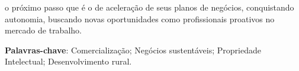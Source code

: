 \begin{resumo}
o próximo passo que é o de aceleração de seus planos de negócios, conquistando autonomia, buscando novas oportunidades como profissionais proativos no mercado de trabalho.

\textbf{Palavras-chave}: Comercialização; Negócios sustentáveis; Propriedade Intelectual; Desenvolvimento rural.
\end{resumo}